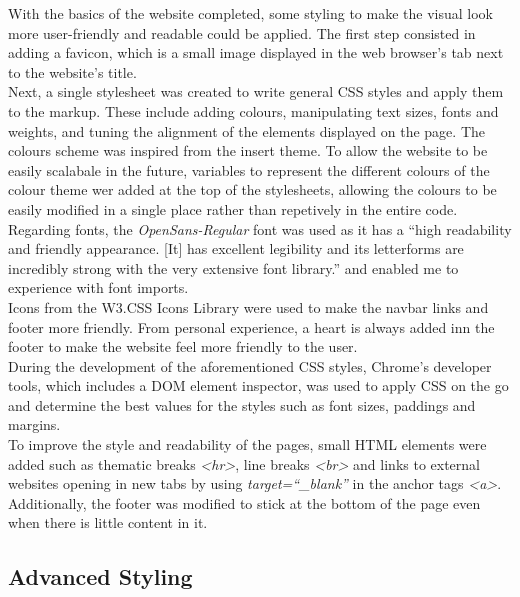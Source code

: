 \documentclass[letterpaper,12pt]{article}
\begin{document}
With the basics of the website completed, some styling to make the visual look more user-friendly and readable could be applied. The first step consisted in adding a favicon, which is a small image displayed in the web browser's tab next to the website's title.\\

Next, a single stylesheet was created to write general CSS styles and apply them to the markup. These include adding colours, manipulating text sizes, fonts and weights, and tuning the alignment of the elements displayed on the page. The colours scheme was inspired from the insert theme. To allow the website to be easily scalabale in the future, variables to represent the different colours of the colour theme wer added at the top of the stylesheets, allowing the colours to be easily modified in a single place rather than repetively in the entire code. Regarding fonts, the \textit{OpenSans-Regular} font was used as it has a ``high readability and friendly appearance. [It] has excellent legibility and its letterforms are incredibly strong with the very extensive font library.'' and enabled me to experience with font imports.\\

Icons from the W3.CSS Icons Library were used to make the navbar links and footer more friendly. From personal experience, a heart is always added inn the footer to make the website feel more friendly to the user.\\

During the development of the aforementioned CSS styles, Chrome's developer tools, which includes a DOM element inspector, was used to apply CSS on the go and determine the best values for the styles such as font sizes, paddings and margins.\\

To improve the style and readability of the pages, small HTML elements were added such as thematic breaks \textit{\textless hr\textgreater}, line breaks \textit{\textless br\textgreater} and links to external websites opening in new tabs by using \textit{target=``\_blank''} in the anchor tags \textit{\textless a\textgreater}. Additionally, the footer was modified to stick at the bottom of the page even when there is little content in it.

\subsection{Advanced Styling}
\label{sec:advanced-styling}
\end{document}
